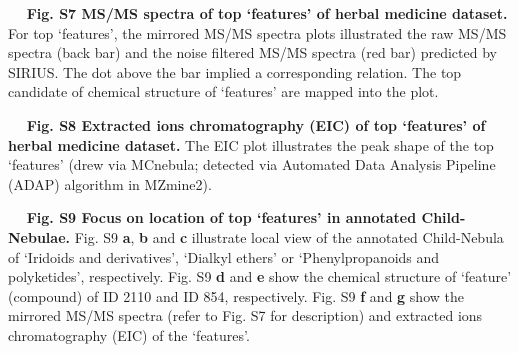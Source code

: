 \documentclass[
]{article}
\begin{document}
   \textbf{Fig. S7 \textbar{} MS/MS spectra of top `features' of herbal
medicine dataset.} For top `features', the mirrored MS/MS spectra plots
illustrated the raw MS/MS spectra (back bar) and the noise filtered
MS/MS spectra (red bar) predicted by SIRIUS. The dot above the bar
implied a corresponding relation. The top candidate of chemical
structure of `features' are mapped into the plot.

   \textbf{Fig. S8 \textbar{} Extracted ions chromatography (EIC) of top
`features' of herbal medicine dataset.} The EIC plot illustrates the
peak shape of the top `features' (drew via MCnebula; detected via
Automated Data Analysis Pipeline (ADAP) algorithm in MZmine2).

   \textbf{Fig. S9 \textbar{} Focus on location of top `features' in
annotated Child-Nebulae.} Fig. S9 \textbf{a}, \textbf{b} and \textbf{c}
illustrate local view of the annotated Child-Nebula of `Iridoids and
derivatives', `Dialkyl ethers' or `Phenylpropanoids and polyketides',
respectively. Fig. S9 \textbf{d} and \textbf{e} show the chemical
structure of `feature' (compound) of ID 2110 and ID 854, respectively.
Fig. S9 \textbf{f} and \textbf{g} show the mirrored MS/MS spectra (refer
to Fig. S7 for description) and extracted ions chromatography (EIC) of
the `features'.
\end{document}
